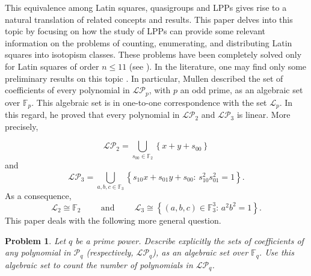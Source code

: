\documentclass[pdflatex,sn-mathphys-num]{sn-jnl}
\theoremstyle{thmstyleone}%
\newtheorem{problem}{Problem}[section]
\begin{document}
This equivalence among Latin squares, quasigroups and LPPs gives rise to a natural translation of related concepts and results. This paper delves into this topic by focusing on how the study of LPPs can provide some relevant information on the problems of counting, enumerating, and distributing Latin squares into isotopism classes. These problems have been completely solved only for Latin squares of order $n\leq 11$ (see \cite{Hulpke2011,Kolesova1990,McKay2007}). In the literature, one may find only some preliminary results on this topic \cite{Mullen1980, Mullen1980a, Lee1994, Diestelkamp2004, Gutierrez2023, Gutierrez2025,Gutierrez2025a,Hasan2026}. In particular, Mullen  \cite{Mullen1980} described  the set of coefficients of every polynomial in $\mathcal{LP}_p$, with $p$ an odd prime, as an algebraic set over $\mathbb{F}_p$. This algebraic set is in one-to-one correspondence with the set $\mathcal{L}_p$. In this regard, he proved that every polynomial in $\mathcal{LP}_2$ and $\mathcal{LP}_3$ is linear. More precisely,

\begin{equation}\label{eq_LPP2}
\mathcal{LP}_2=\bigcup_{s_{00}\in \mathbb{F}_2}\left\{x+y+s_{00}\right\}
\end{equation}
and
\begin{equation}\label{eq_LPP3}\mathcal{LP}_3=\bigcup_{a,b,c\in \mathbb{F}_3}\left\{s_{10}x+s_{01}y+s_{00}\colon\,  s_{10}^2s_{01}^2=1\right\}.
\end{equation}
As a consequence,
\[\mathcal{L}_2\cong \mathbb{F}_2 \hspace{1cm}\text{and}\hspace{1cm} \mathcal{L}_3\cong \left\{(a,b,c)\in\mathbb{F}_3^3\colon\,a^2b^2=1\right\}.\]
This paper deals with the following more general question. 

\begin{problem}\label{problem_algebraic set} Let $q$ be a prime power. Describe explicitly the sets of coefficients of any polynomial in $\mathcal{P}_q$ (respectively, $\mathcal{LP}_q$), as an algebraic set over $\mathbb{F}_q$. Use this algebraic set to count the number of polynomials in $\mathcal{LP}_q$.
\end{problem}
\end{document}
